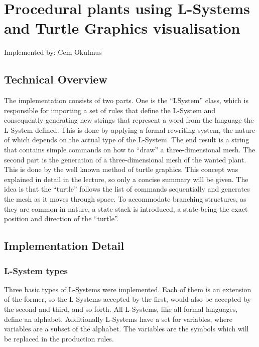 \documentclass[11pt,a4paper]{article}
\begin{document}
\section{Procedural plants using L-Systems and Turtle Graphics \newline visualisation}
Implemented by: Cem Okulmus

\subsection{Technical Overview}
The implementation consists of two parts. One is the ``LSystem'' class, which is
responsible for importing a set of rules that define the L-System and
consequently generating new strings that represent a word from the language the
L-System defined. This is done by applying a formal rewriting system, the nature
of which depends on the actual type of the L-System. The end result is a string that contains simple commands on how to ``draw'' a three-dimensional mesh.
\newline
The second part is the generation of a three-dimensional mesh of the wanted
plant. This is done by the well known method of turtle graphics. This concept was
explained in detail in the lecture, so only a concise summary will be given. 
The idea is that the ``turtle'' follows the list of commands sequentially and
generates the mesh as it moves through space. To accommodate branching
structures, as they are common in nature, a state stack is introduced, a state
being the exact position and direction of the ``turtle''.

\subsection{Implementation Detail}

\subsubsection{L-System types}
Three basic types of L-Systems were implemented. Each of them is an extension of the former, so the L-Systems accepted by the first, would also be accepted by the second and third, and so forth. All L-Systems, like all formal languages, define an alphabet. Additionally L-Systems have a set for variables, where variables are a subset of the alphabet. The variables are the symbols which will be replaced in the production rules.
\end{document}
